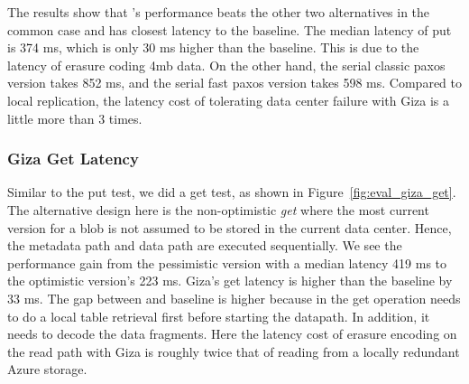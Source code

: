 The results show that \name's performance beats the other two alternatives in the common case and has closest
latency to the baseline. The median latency of \name put is 374 ms, which is only 30 ms
higher than the baseline. This is due to the latency of erasure coding 4mb data. On the other hand, the serial classic paxos version takes 
852 ms, and the serial fast paxos version takes 598 ms. Compared to local replication, the latency cost of tolerating data center failure with Giza is a little more than 3 times.

\subsubsection{Giza Get Latency}

Similar to the put test, we did a \name get test, as shown in Figure~\ref{fig:eval_giza_get}. The alternative design here is the non-optimistic {\em get } where the most current version for a blob is not assumed to be stored in the current data center. Hence, the metadata path and data path are executed sequentially. We see the performance gain from the pessimistic version with a median latency 419 ms to the optimistic version's 223 ms. Giza's get latency is higher than the baseline by 33 ms. The gap between \name and baseline is higher because in the get operation \name needs to do a local table retrieval first before starting the datapath. In addition, it needs to decode the data fragments. Here the latency cost of erasure encoding on the read path with Giza is roughly twice that of reading from a locally redundant Azure storage.





